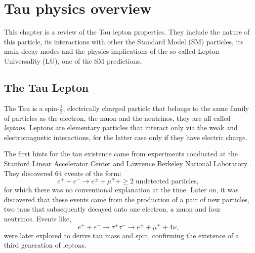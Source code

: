 \chapter{Tau physics overview}\label{chap:relatedwork}
This chapter is a review of the Tau lepton properties. They include the nature of this particle, its interactions with other the Standard Model (SM) particles, its main decay modes and the physics implications of the so called Lepton Universality (LU), one of the SM predictions.  

\section{The Tau Lepton}\label{chap2sec1}
The Tau is a spin-$\frac{1}{2}$, electrically charged particle that belongs to the same family of particles as the electron, the muon and the neutrinos, they are all called \textit{leptons}. Leptons are elementary particles that interact only via the weak and electromagnetic interactions, for the latter case only if they have electric charge.  

The first hints for the tau existence came from experiments conducted at the Stanford Linear Accelerator Center and Lawrence Berkeley National Laboratory \cite{PhysRevLett.35.1489}. They discovered 64 events of the form:
\begin{equation}
	e^+ + e^- \to e^\pm + \mu^\mp + \geq \text{2 undetected particles},
\end{equation}
for which there was no conventional explanation at the time. Later on, it was discovered that these events came from the production of a pair of new particles, two taus that subsequently decayed onto one electron, a muon and four neutrinos. Events like,
\begin{equation}
e^+ + e^- \to \tau^+ \tau^- \to e^\pm + \mu^\mp + 4\nu,
\end{equation}	
were later explored to derive tau mass and spin, confirming the existence of a third generation of leptons. 

